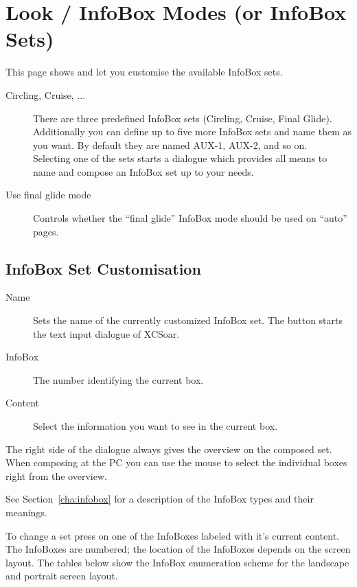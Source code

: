 \section{Look / InfoBox Modes (or InfoBox Sets)}\label{sec:infobox_sets}
\label{conf:infobox_sets}

This page shows and let you customise the available InfoBox sets.

\begin{description}
\item[Circling, Cruise, ...]  There are three predefined InfoBox sets (Circling, Cruise, Final Glide). 
  Additionally you can define up to five more InfoBox sets and name them as you want.   
  By default they are named AUX-1, AUX-2, and so on. \\
  Selecting one of the sets starts a dialogue which provides all means to name and 
  compose an InfoBox set up to your needs.

\item[Use final glide mode]  Controls whether the ``final glide'' InfoBox mode should be used on ``auto'' pages.
\end{description}

\subsection*{InfoBox Set Customisation}

\begin{description}
\item[Name]  Sets the name of the currently customized InfoBox set. The 
  button starts the text input dialogue of XCSoar.
\item[InfoBox]  The number identifying the current box.
\item[Content]  Select the information you want to see in the current box.
\end{description}

The right side of the dialogue always gives the overview on the composed set. 
When composing at the PC you can use the mouse to select the individual boxes 
right from the overview.

See Section~\ref{cha:infobox} for a description of the InfoBox types and their meanings.

To change a set press on one of the InfoBoxes labeled with it's current content.
The InfoBoxes are numbered; the location of the InfoBoxes depends on the screen layout.  
The tables below show the InfoBox enumeration scheme for the
landscape and portrait screen layout.

